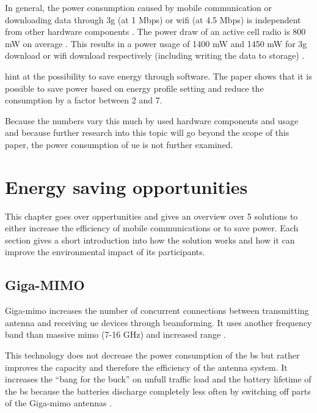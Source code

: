 \documentclass[11pt,a4paper]{article}
\begin{document}
In general, the power consumption caused by mobile communication or downloading data through \acrshort{3g} (at 1 Mbps) or \acrshort{wifi} (at 4.5 Mbps) is independent from other hardware components \citep{smartphoneEnergySurvey}.
The power draw of an active cell radio is 800 mW on average \citep{smartphoneEnergyConsumption}.
This results in a power usage of 1400 mW and 1450 mW for \acrshort{3g} download or \acrshort{wifi} download respectively (including writing the data to storage) \citep{smartphoneEnergySurvey}.

\cite{profilingMobilePower} hint at the possibility to save energy through software.
The paper shows that it is possible to save power based on energy profile setting and reduce the consumption by a factor between 2 and 7.

Because the numbers vary this much by used hardware components and usage and because further research into this topic will go beyond the scope of this paper, the power consumption of \acrlong{ue} is not further examined.

\section{Energy saving opportunities}\label{sec:opportunities}
This chapter goes over oppertunities and gives an overview over 5 solutions to either increase the efficiency of mobile communications or to save power.
Each section gives a short introduction into how the solution works and how it can improve the environmental impact of its participants.

\subsection{Giga-MIMO}\label{subsec:gigamimo}
Giga-\acrshort{mimo} increases the number of concurrent connections between transmitting antenna and receiving \acrlong{ue} devices through beamforming.
It uses another frequency band than massive \acrshort{mimo} (7-16 GHz) and increased range \citep{3gpp17}.

This technology does not decrease the power consumption of the \acrlong{bs} but rather improves the capacity and therefore the efficiency of the antenna system.
It increases the \enquote{bang for the buck} on unfull traffic load and the battery lifetime of the \acrshort{bs} because the batteries discharge completely less often by switching off parts of the Giga-\acrshort{mimo} antennas \citep{qualcomm2022}.
\end{document}
